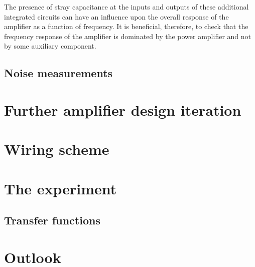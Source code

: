 The presence of stray capacitance at the inputs and outputs of these additional integrated circuits can have an influence upon the overall response of the amplifier as a function of frequency. It is beneficial, therefore, to check that the frequency response of the amplifier is dominated by the power amplifier and not by some auxiliary component.

\subsection{Noise measurements}


\section{\label{sec:hv-amplifier-alt}Further amplifier design iteration}

\section{Wiring scheme}

\section{The experiment}

\subsection{Transfer functions}

\section{Outlook}